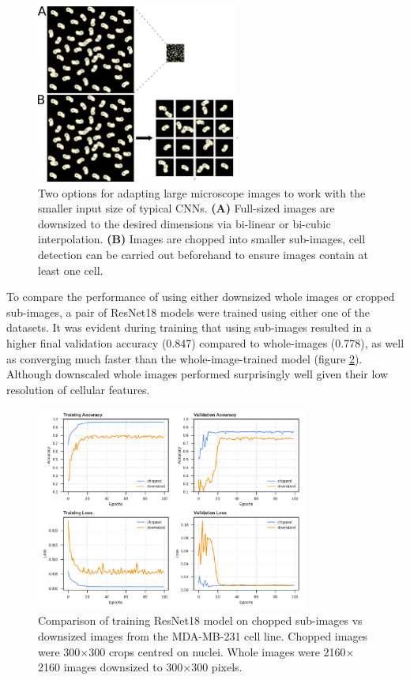 \documentclass[a4paper,11pt,twoside,openright]{scrbook}
\begin{document}
\begin{figure}
    \includegraphics[width=0.6\textwidth]{ch2ImageChopping}
    \captionsetup{width=0.8\textwidth}
    \caption[Down-sizing and chopping images for CNN training]{Two options for adapting large microscope images to work 
with the smaller input size of typical CNNs. \textbf{(A)} Full-sized images are downsized to the desired dimensions via 
bi-linear or bi-cubic interpolation. \textbf{(B)} Images are chopped into smaller sub-images, cell detection can be 
carried out beforehand to ensure images contain at least one cell.}
    \label{figure:image_chopping}
\end{figure}

To compare the performance of using either downsized whole images or cropped sub-images, a pair of ResNet18 models were 
trained using either one of the datasets.
It was evident during training that using sub-images resulted in a higher final validation accuracy (0.847) compared to 
whole-images (0.778), as well as converging much faster than the whole-image-trained model (figure 
\ref{figure:nn_chopped_vs_whole_curves}).
Although downscaled whole images performed surprisingly well given their low resolution of cellular features.

\begin{figure}
    \includegraphics[width=0.8\textwidth]{ch2choppedVsWhole}
    \captionsetup{width=0.8\textwidth}
    \caption[Comparison of whole images vs sub-images]{
Comparison of training ResNet18 model on chopped sub-images vs downsized images from the MDA-MB-231 cell line.
Chopped images were 300$\times$300 crops centred on nuclei.
Whole images were 2160$\times$2160 images downsized to 300$\times$300 pixels.
}
    \label{figure:nn_chopped_vs_whole_curves}
\end{figure}
\end{document}
